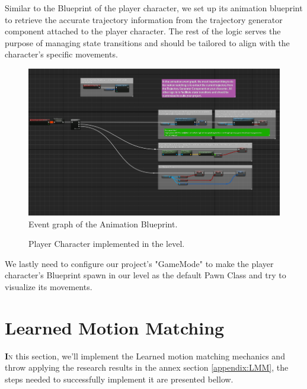 \documentclass[12pt]{book}
\begin{document}
Similar to the Blueprint of the player character, we set up its animation blueprint to retrieve the accurate trajectory information from the trajectory generator component attached to the player character. The rest of the logic serves the purpose of managing state transitions and should be tailored to align with the character's specific movements.
 \begin{figure}[!h]
    \centering
     \includegraphics[scale=0.5]{Figures/Images/demo event graph MS.png}
    \caption{Event graph of the Animation Blueprint.}
   \end{figure}
\newpage
   \begin{figure}[!h]
    \centering
    \caption{Player Character implemented in the level.}
   \end{figure}
We lastly need to configure our project's "GameMode" to make the player character's Blueprint spawn in our level as the default Pawn Class and try to visualize its movements.

\newpage

\section{Learned Motion Matching}
\lettrine[findent=1pt]{\textbf{I}}{n} this section, we'll implement the Learned motion matching mechanics and throw applying the research results in the annex section \ref{appendix:LMM}, the steps needed to successfully implement it are presented bellow.
\newpage
\end{document}
